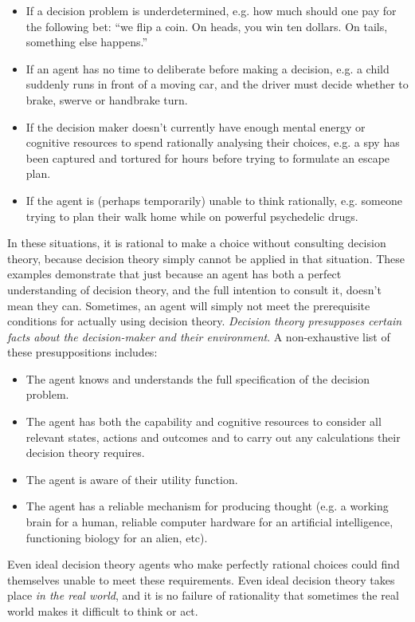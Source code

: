 \documentclass{article}
\begin{document}
\begin{itemize}  
\item If a decision problem is underdetermined, e.g. how much should one pay for the following bet: ``we flip a coin. On heads, you win ten dollars. On tails, something else happens.''
\item If an agent has no time to deliberate before making a decision, e.g. a child suddenly runs in front of a moving car, and the driver must decide whether to brake, swerve or handbrake turn.
\item If the decision maker doesn't currently have enough mental energy or cognitive resources to spend rationally analysing their choices, e.g. a spy has been captured and tortured for hours before trying to formulate an escape plan.
\item If the agent is (perhaps temporarily) unable to think rationally, e.g. someone trying to plan their walk home while on powerful psychedelic drugs.
\end{itemize}

In these situations, it is rational to make a choice without consulting decision theory, because decision theory simply cannot be applied in that situation. These examples demonstrate that just because an agent has both a perfect understanding of decision theory, and the full intention to consult it, doesn't mean they can. Sometimes, an agent will simply not meet the prerequisite conditions for actually using decision theory. \textit{Decision theory presupposes certain facts about the decision-maker and their environment}. A non-exhaustive list of these presuppositions includes:

\begin{itemize}  
\item The agent knows and understands the full specification of the decision problem.
\item The agent has both the capability and cognitive resources to consider all relevant states, actions and outcomes and to carry out any calculations their decision theory requires.
\item The agent is aware of their utility function.
\item The agent has a reliable mechanism for producing thought (e.g. a working brain for a human, reliable computer hardware for an artificial intelligence, functioning biology for an alien, etc).
\end{itemize}

Even ideal decision theory agents who make perfectly rational choices could find themselves unable to meet these requirements. Even ideal decision theory takes place \textit{in the real world}, and it is no failure of rationality that sometimes the real world makes it difficult to think or act.
\end{document}
